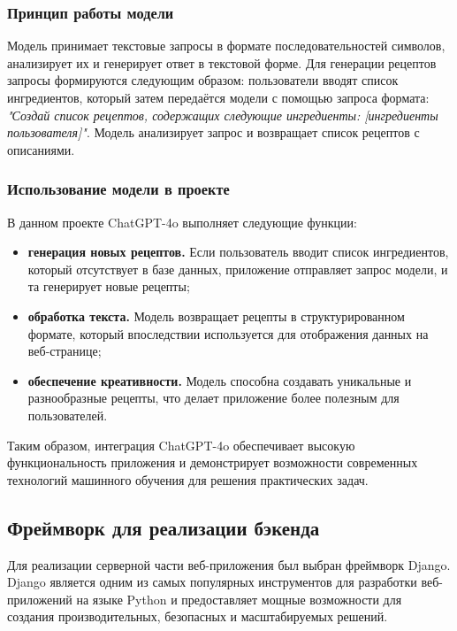 {{\subsubsection*{Принцип работы модели}
Модель принимает текстовые запросы в формате последовательностей символов, анализирует их и генерирует ответ в текстовой форме. Для генерации рецептов запросы формируются следующим образом: пользователи вводят список ингредиентов, который затем передаётся модели с помощью запроса формата: \textit{"Создай список рецептов, содержащих следующие ингредиенты: [ингредиенты пользователя]"}. Модель анализирует запрос и возвращает список рецептов с описаниями.

\subsubsection*{Использование модели в проекте}
В данном проекте ChatGPT-4o выполняет следующие функции:
\begin{itemize}
    \item \textbf{генерация новых рецептов.} Если пользователь вводит список ингредиентов, который отсутствует в базе данных, приложение отправляет запрос модели, и та генерирует новые рецепты;
    \item \textbf{обработка текста.} Модель возвращает рецепты в структурированном формате, который впоследствии используется для отображения данных на веб-странице;
    \item \textbf{обеспечение креативности.} Модель способна создавать уникальные и разнообразные рецепты, что делает приложение более полезным для пользователей.
\end{itemize}

Таким образом, интеграция ChatGPT-4o обеспечивает высокую функциональность приложения и демонстрирует возможности современных технологий машинного обучения для решения практических задач.

    \subsection{Фреймворк для реализации бэкенда}
    Для реализации серверной части веб-приложения был выбран фреймворк Django. Django является одним из самых популярных инструментов для разработки веб-приложений на языке Python и предоставляет мощные возможности для создания производительных, безопасных и масштабируемых решений.

}}
